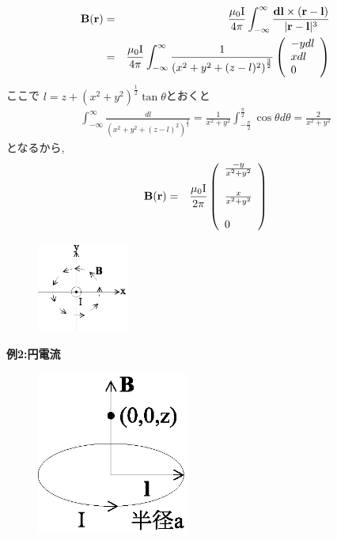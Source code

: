 \documentclass[../main]{subfiles}
\begin{document}
\begin{eqnarray*}
{\bf B}({\bf r})&=&\frac{\mu_0 {\rm I}}{4 \pi} \int_{- \infty}^{\infty}\frac{{\bf dl} \times ({\bf r}-{\bf l})}{|{\bf r}-{\bf l}|^3} \\
&=& \frac{\mu_0 {\rm I}}{4 \pi} \int_{- \infty}^{\infty}\frac{1}{\left( x^2+y^2+(z-l)^2 \right)^{\frac{3}{2}}}
\left(
\begin{array}{l}
-ydl \\
xdl \\
0
\end{array}
\right)
\end{eqnarray*}
ここで $l=z+(x^2+y^2)^{\frac{1}{2}}\tan\theta$とおくと
\begin{eqnarray*}
\int_{- \infty}^{\infty}\frac{dl}{\left( x^2+y^2+(z-l)^2 \right)^{\frac{3}{2}}} = \frac{1}{x^2+y^2} \int_{- \frac{\pi}{2}}^{\frac{\pi}{2}} \cos\theta d\theta = \frac{2}{x^2+y^2}
\end{eqnarray*}
となるから,
\begin{eqnarray*}
{\bf B}({\bf r})&=&\frac{\mu_0 {\rm I}}{2 \pi}
\left(
\begin{array}{l}
\frac{-y}{x^2+y^2} \\
\\
\frac{x}{x^2+y^2} \\
\\
0
\end{array}
\right)
\end{eqnarray*}
\begin{figure}[h]
 \begin{center}
  \includegraphics[width=30mm]{8.3.eps}
 \end{center}
 \caption{}
 \label{fig:three}
\end{figure}
\newpage
{\bf 例2:円電流} \\
\begin{figure}[htbp]
 \begin{center}
  \includegraphics[width=50mm]{8.4.eps}
 \end{center}
 \caption{}
 \label{fig:four}
\end{figure}
\end{document}
